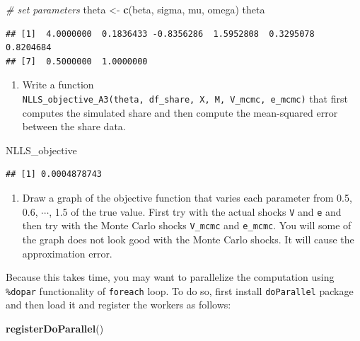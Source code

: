 \documentclass[]{book}
\newenvironment{Shaded}{\begin{snugshade}}{\end{snugshade}}
\newcommand{\KeywordTok}[1]{\textcolor[rgb]{0.13,0.29,0.53}{\textbf{#1}}}
\newcommand{\StringTok}[1]{\textcolor[rgb]{0.31,0.60,0.02}{#1}}
\newcommand{\CommentTok}[1]{\textcolor[rgb]{0.56,0.35,0.01}{\textit{#1}}}
\newcommand{\NormalTok}[1]{#1}
\providecommand{\tightlist}{%
  \setlength{\itemsep}{0pt}\setlength{\parskip}{0pt}}
\begin{document}
\begin{Shaded}
\begin{Highlighting}[]
\CommentTok{# set parameters}
\NormalTok{theta <-}\StringTok{ }\KeywordTok{c}\NormalTok{(beta, sigma, mu, omega)}
\NormalTok{theta}
\end{Highlighting}
\end{Shaded}

\begin{verbatim}
## [1]  4.0000000  0.1836433 -0.8356286  1.5952808  0.3295078  0.8204684
## [7]  0.5000000  1.0000000
\end{verbatim}

\begin{enumerate}
\def\labelenumi{\arabic{enumi}.}
\setcounter{enumi}{5}
\tightlist
\item
  Write a function
  \texttt{NLLS\_objective\_A3(theta,\ df\_share,\ X,\ M,\ V\_mcmc,\ e\_mcmc)}
  that first computes the simulated share and then compute the
  mean-squared error between the share data.
\end{enumerate}

\begin{Shaded}
\begin{Highlighting}[]
\NormalTok{NLLS_objective}
\end{Highlighting}
\end{Shaded}

\begin{verbatim}
## [1] 0.0004878743
\end{verbatim}

\begin{enumerate}
\def\labelenumi{\arabic{enumi}.}
\setcounter{enumi}{6}
\tightlist
\item
  Draw a graph of the objective function that varies each parameter from
  0.5, 0.6, \(\cdots\), 1.5 of the true value. First try with the actual
  shocks \texttt{V} and \texttt{e} and then try with the Monte Carlo
  shocks \texttt{V\_mcmc} and \texttt{e\_mcmc}. You will some of the
  graph does not look good with the Monte Carlo shocks. It will cause
  the approximation error.
\end{enumerate}

Because this takes time, you may want to parallelize the computation
using \texttt{\%dopar} functionality of \texttt{foreach} loop. To do so,
first install \texttt{doParallel} package and then load it and register
the workers as follows:

\begin{Shaded}
\begin{Highlighting}[]
\KeywordTok{registerDoParallel}\NormalTok{()}
\end{Highlighting}
\end{Shaded}
\end{document}
